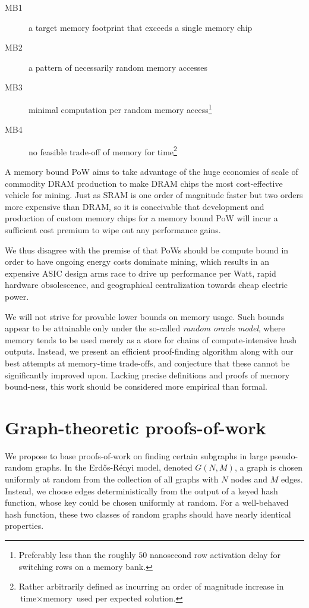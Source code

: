 \documentclass[11pt, oneside]{article}
\begin{document}
\begin{description}
\item[MB1] a target memory footprint that exceeds a single memory chip
\item[MB2] a pattern of necessarily random memory accesses
\item[MB3] minimal computation per random memory access\footnote{Preferably less than
the roughly $50$ nanosecond row activation delay for switching rows on a memory bank.}
\item[MB4] no feasible trade-off of memory for time\footnote{Rather arbitrarily
defined as incurring an order of magnitude increase
in $\mbox{time}\times\mbox{memory}$ used per expected solution.}
\end{description}

A memory bound PoW aims to take advantage of the huge economies of scale of commodity DRAM production
to make DRAM chips the most cost-effective vehicle for mining.
Just as SRAM is one order of magnitude faster but two orders more expensive than DRAM,
so it is conceivable that development and production of custom memory chips for a memory bound PoW
will incur a sufficient cost premium to wipe out any performance gains.

We thus disagree with the premise of \cite{poelstra2014} that PoWs should be compute bound
in order to have ongoing energy costs dominate mining, which results in an expensive ASIC
design arms race to drive up performance per Watt, rapid hardware obsolescence,
and geographical centralization towards cheap electric power.

We will not strive for provable lower bounds on memory usage. Such bounds appear to be
attainable only under the so-called {\em random oracle model}, where memory tends to be used
merely as a store for chains of compute-intensive hash outputs.
Instead, we present an efficient proof-finding algorithm
along with our best attempts at memory-time trade-offs,
and conjecture that these cannot be significantly improved upon.
Lacking precise definitions and proofs of memory bound-ness, this work should be considered
more empirical than formal.

\section{Graph-theoretic proofs-of-work}
We propose to base proofs-of-work on finding certain subgraphs in large pseudo-random graphs.
In the Erd\H{o}s-R\'{e}nyi model, denoted $G(N,M)$, a graph is chosen uniformly at random
from the collection of all graphs with $N$ nodes and $M$ edges. Instead, we choose edges
deterministically from the output of a keyed hash function, whose key could be chosen
uniformly at random. For a well-behaved hash function, these two classes of random graphs
should have nearly identical properties.
\end{document}
